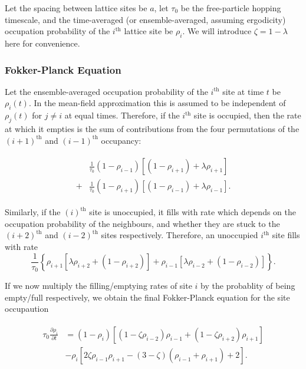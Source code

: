 \documentclass[
reprint, amsmath,amssymb, aps,
]{revtex4-1}
\newcommand{\partDeriv}[2]{\frac{\partial #1}{\partial #2}}
\begin{document}
Let the spacing between lattice
sites be $a$, let $\tau_0$ be the free-particle hopping timescale, and
the time-averaged (or ensemble-averaged, assuming ergodicity)
occupation probability of the $i^{\mathrm{th}}$ lattice site be
$\rho_i$.  We will introduce $\zeta = 1 - \lambda $ here for convenience.

\subsubsection{Fokker-Planck Equation} Let the ensemble-averaged occupation
probability of the $i^\mathrm{th}$ site at time $t$ be $\rho_i
(t)$. In the mean-field approximation this is assumed to be
independent of $\rho_j(t)$ for $j \neq i $ at equal times. Therefore,
if the $i^\mathrm{th}$ site is occupied, then the rate at which it empties
is the sum of contributions from the
four permutations of the $(i+1)^\mathrm{th}$ and
$(i-1)^\mathrm{th}$ occupancy: 

\begin{align}
\begin{split}
 &\frac{1}{\tau_0 } (1-\rho_{i-1})\left[ (1 - \rho_{i+1}) + \lambda \rho_{i+1} \right] \\
 +&\frac{1}{\tau_0 } (1-\rho_{i+1})\left[ (1 - \rho_{i-1}) + \lambda \rho_{i-1} \right] .
\end{split}
 \end{align}

Similarly, if the $(i)^\mathrm{th}$ site is unoccupied, it fills with
rate which depends on the occupation probability of the neighbours,
and whether they are stuck to the $(i+2)^\mathrm{th}$ and $(i-2)^\mathrm{th}$ sites
respectively. Therefore, an unoccupied $i^\mathrm{th}$ site fills with rate
\begin{equation}
\frac{1}{\tau_0 } \left\{ \rho_{i+1} \left[ \lambda \rho_{i+2} + (1-\rho_{i+2}) \right] + \rho_{i-1} \left[ \lambda \rho_{i-2} + (1-\rho_{i-2}) \right] \right\}.
\end{equation}

If we now multiply the filling/emptying rates of site $i$ by the
probablity of being empty/full respectively, we obtain the
final Fokker-Planck equation for the site occupaution 

\begin{align}
\label{eq:latticeMFT}
\begin{split}
 \tau_0 \partDeriv{\rho_i}{t} &= \left( 1-\rho_i \right) \left[ \left(1-\zeta\rho_{i-2} \right) \rho_{i-1} + \left(1-\zeta\rho_{i+2} \right) \rho_{i+1} \right] \\
 &- \rho_i \left[ 2 \zeta \rho_{i-1} \rho_{i+1}  - (3-\zeta)\left(\rho_{i-1} + \rho_{i+1}\right) + 2 \right].
 \end{split}
 \end{align}
\end{document}

